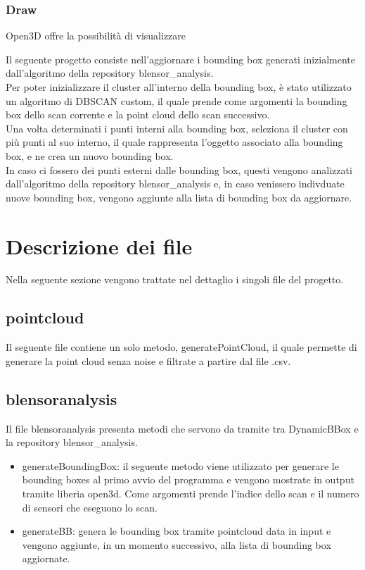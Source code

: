 \documentclass[italian]{article}
\begin{document}
\subsubsection{Draw}
Open3D offre la possibilità di visualizzare 

Il seguente progetto consiste nell'aggiornare i bounding box generati inizialmente dall'algoritmo della repository blensor\_analysis.\\
Per poter inizializzare il cluster all'interno della bounding box, è stato utilizzato un algoritmo di DBSCAN custom, il quale prende come argomenti la bounding box dello scan corrente e la point cloud dello scan successivo.\\
Una volta determinati i punti interni alla bounding box, seleziona il cluster con più punti al suo interno, il quale rappresenta l'oggetto associato alla bounding box, e ne crea un nuovo bounding box.\\
In caso ci fossero dei punti esterni dalle bounding box, questi vengono analizzati dall'algoritmo della repository blensor\_analysis e, in caso venissero indivduate nuove bounding box, vengono aggiunte alla lista di bounding box da aggiornare.\\
\section{Descrizione dei file}
Nella seguente sezione vengono trattate nel dettaglio i singoli file del progetto.
\subsection{pointcloud}
Il seguente file contiene un solo metodo, generatePointCloud, il quale permette di generare la point cloud senza noise e filtrate a partire dal file .csv.\\
\subsection{blensoranalysis}
Il file blensoranalysis presenta metodi che servono da tramite tra DynamicBBox e la repository blensor\_analysis.
\begin{itemize}
		\item generateBoundingBox: il seguente metodo viene utilizzato per generare le bounding boxes al primo avvio del programma e vengono mostrate in output tramite liberia open3d. Come argomenti prende
			l'indice dello scan e il numero di sensori che eseguono lo scan. 
 		\item generateBB: genera le bounding box tramite pointcloud data in input e vengono aggiunte, in un momento successivo, alla lista di bounding box aggiornate.
\end{itemize}
\end{document}
